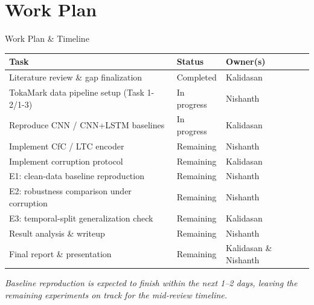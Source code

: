 \documentclass[aspectratio=169]{beamer}
\begin{document}
\section{Work Plan}
\begin{frame}{Work Plan \& Timeline}
  \scriptsize
  \renewcommand{\arraystretch}{1.15}
  \begin{tabular}{P{6.5cm}P{2.6cm}P{2.6cm}}
    \toprule
    \textbf{Task} & \textbf{Status} & \textbf{Owner(s)} \\
    \midrule
    Literature review \& gap finalization & Completed & Kalidasan \\
    TokaMark data pipeline setup (Task 1-2/1-3) & In progress & Nishanth \\
    Reproduce CNN / CNN+LSTM baselines & In progress & Kalidasan \\
    Implement CfC / LTC encoder & Remaining & Nishanth \\
    Implement corruption protocol & Remaining & Kalidasan \\
    E1: clean-data baseline reproduction & Remaining & Nishanth \\
    E2: robustness comparison under corruption & Remaining & Nishanth \\
    E3: temporal-split generalization check & Remaining & Kalidasan \\
    Result analysis \& writeup & Remaining & Nishanth \\
    Final report \& presentation & Remaining & Kalidasan \& Nishanth \\
    \bottomrule
  \end{tabular}
  \vspace{8pt}

  \footnotesize\textit{Baseline reproduction is expected to finish within the next 1--2 days,
  leaving the remaining experiments on track for the mid-review timeline.}
\end{frame}

\end{document}
